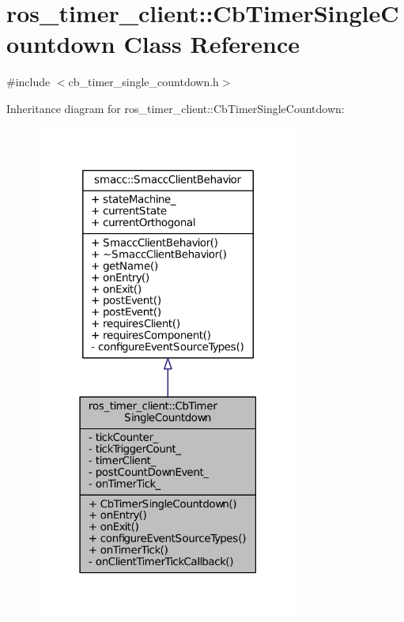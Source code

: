 \hypertarget{classros__timer__client_1_1CbTimerSingleCountdown}{}\section{ros\+\_\+timer\+\_\+client\+:\+:Cb\+Timer\+Single\+Countdown Class Reference}
\label{classros__timer__client_1_1CbTimerSingleCountdown}


{\ttfamily \#include $<$cb\+\_\+timer\+\_\+single\+\_\+countdown.\+h$>$}



Inheritance diagram for ros\+\_\+timer\+\_\+client\+:\+:Cb\+Timer\+Single\+Countdown\+:
\nopagebreak
\begin{figure}[H]
\begin{center}
\leavevmode
\includegraphics[width=247pt]{classros__timer__client_1_1CbTimerSingleCountdown__inherit__graph}
\end{center}
\end{figure}


